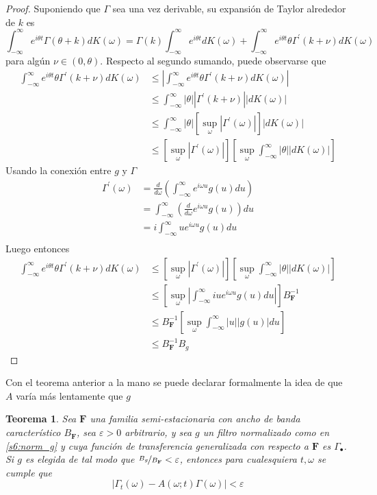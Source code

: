 \documentclass[12pt,letterpaper]{book}
\newtheorem{teorema}{Teorema}[chapter]
\newcommand{\intR}{\int_{-\infty}^{\infty}}
\newcommand{\prima}{^{\prime}}
\newcommand{\ef}{\mathbf{F}}
\newcommand{\abso}[1]{\left| #1 \right|}
\begin{document}
\begin{proof}
Suponiendo que $\Gamma$ sea una vez derivable, su expansión de Taylor alrededor de $k$ es
\begin{equation*}
\intR e^{i\theta t} \Gamma(\theta + k) dK(\omega)
= \Gamma(k) \intR e^{i \theta t} dK(\omega) + 
\intR e^{i \theta t} \theta \Gamma\prima(k + \nu) dK(\omega)
\end{equation*}
para algún $\nu \in (0,\theta)$. Respecto al segundo sumando, puede observarse que
\begin{align*}
\intR e^{i \theta t} \theta \Gamma\prima(k + \nu) dK(\omega)
&\leq
\abso{ \intR e^{i \theta t} \theta \Gamma\prima(k + \nu) dK(\omega)} \\
&\leq
\intR \abso{ \theta} \abso{ \Gamma\prima(k + \nu)} \abso{ dK(\omega)} \\
&\leq
\intR \abso{ \theta} \left[ \sup_\omega \abso{ \Gamma\prima(\omega)} \right] \abso{ dK(\omega)} \\
&\leq
\left[ \sup_\omega \abso{ \Gamma\prima(\omega)} \right]
\left[ \sup_\omega
\intR \abso{ \theta} \abso{ dK(\omega)} \right]
\end{align*}
Usando la conexión entre $g$ y $\Gamma$
\begin{align*}
\Gamma\prima(\omega) 
&= \frac{d}{d\omega} \left( \intR e^{i \omega u} g(u) du \right) \\
&= \intR \left( \frac{d}{d\omega} e^{i \omega u} g(u) \right) du \\
&= i \intR u e^{i \omega u} g(u) du \\
\end{align*}
Luego entonces
\begin{align*}
\intR e^{i \theta t} \theta \Gamma\prima(k + \nu) dK(\omega)
&\leq
\left[ \sup_\omega \abso{ \Gamma\prima(\omega)} \right] 
\left[ \sup_\omega
\intR \abso{ \theta} \abso{ dK(\omega)} \right] \\
&\leq 
\left[ \sup_\omega \abso{ \intR i u e^{i \omega u} g(u) du } \right] 
B_\ef^{-1} \\
&\leq 
B_\ef^{-1}
\left[ \sup_\omega \intR \abso{ u } \abso{ g(u)} du \right] \\
&\leq
B_\ef^{-1} B_g
\end{align*}
\end{proof}

Con el teorema anterior a la mano se puede declarar formalmente la idea de que $A$ varía más lentamente que $g$

\begin{teorema}
Sea $\ef$ una familia semi-estacionaria con ancho de banda característico $B_\ef$, sea $\varepsilon >0$ arbitrario, y sea $g$ un filtro normalizado como en \ref{s6:norm_g} y cuya función de transferencia generalizada con respecto a $\ef$ es $\Gamma_\bullet$. 
%
Si $g$ es elegida de tal modo que $\nicefrac{B_g}{B_\ef} < \varepsilon$, entonces para cualesquiera $t, \omega$ se cumple que
\begin{equation}
\abso{\Gamma_t(\omega)- A(\omega; t)\Gamma(\omega)} < \varepsilon
\end{equation}
\label{teo:aprox_gamma} 
\end{teorema}
\end{document}
